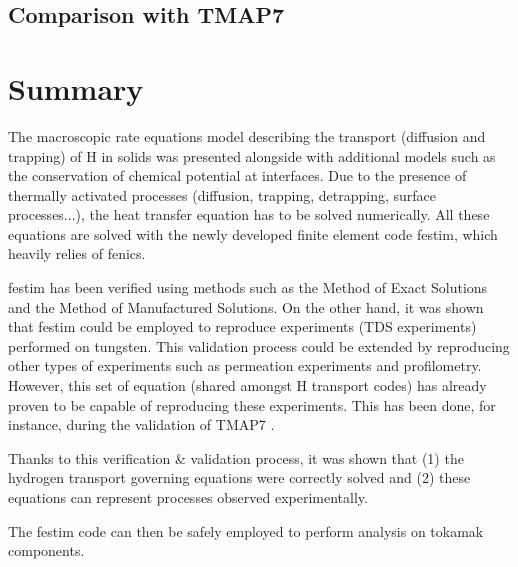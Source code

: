 \subsection{Comparison with TMAP7}



\section{Summary}

The macroscopic rate equations model describing the transport (diffusion and trapping) of H in solids was presented alongside with additional models such as the conservation of chemical potential at interfaces.
Due to the presence of thermally activated processes (diffusion, trapping, detrapping, surface processes...), the heat transfer equation has to be solved numerically.
All these equations are solved with the newly developed finite element code \gls{festim}, which heavily relies of \gls{fenics}.

\gls{festim} has been verified using methods such as the Method of Exact Solutions and the Method of Manufactured Solutions.
On the other hand, it was shown that \gls{festim} could be employed to reproduce experiments (TDS experiments) performed on tungsten.
This validation process could be extended by reproducing other types of experiments such as permeation experiments and profilometry.
However, this set of equation (shared amongst H transport codes) has already proven to be capable of reproducing these experiments.
This has been done, for instance, during the validation of TMAP7 .

Thanks to this verification \& validation process, it was shown that (1) the hydrogen transport governing equations were correctly solved and (2) these equations can represent processes observed experimentally.

The \gls{festim} code can then be safely employed to perform analysis on tokamak components.
